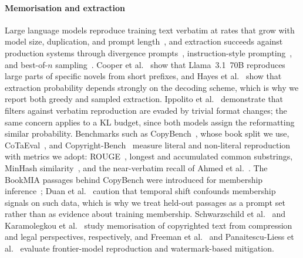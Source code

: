 \paragraph{Memorisation and extraction}
Large language models reproduce training text verbatim at rates that grow with model size, duplication, and prompt length~\cite{carlini2023quantifying}, and extraction succeeds against production systems through divergence prompts~\cite{nasr2025scalable}, instruction-style prompting~\cite{kassem2025alpaca}, and best-of-$n$ sampling~\cite{ahmed2026extracting}. Cooper et al.~\cite{cooper2025extracting} show that Llama~3.1~70B reproduces large parts of specific novels from short prefixes, and Hayes et al.~\cite{hayes2025measuring} show that extraction probability depends strongly on the decoding scheme, which is why we report both greedy and sampled extraction. Ippolito et al.~\cite{ippolito2023preventing} demonstrate that filters against verbatim reproduction are evaded by trivial format changes; the same concern applies to a KL budget, since both models assign the reformatting similar probability. Benchmarks such as CopyBench~\cite{chen2024copybench}, whose book split we use, CoTaEval~\cite{wei2024cotaeval}, and Copyright-Bench~\cite{hui2026copyrightbench} measure literal and non-literal reproduction with metrics we adopt: ROUGE~\cite{lin2004rouge}, longest and accumulated common substrings, MinHash similarity~\cite{broder1997resemblance}, and the near-verbatim recall of Ahmed et al.~\cite{ahmed2026extracting}. The BookMIA passages behind CopyBench were introduced for membership inference~\cite{shi2024detecting}; Duan et al.~\cite{duan2024membership} caution that temporal shift confounds membership signals on such data, which is why we treat held-out passages as a prompt set rather than as evidence about training membership. Schwarzschild et al.~\cite{schwarzschild2024rethinking} and Karamolegkou et al.~\cite{karamolegkou2023copyright} study memorisation of copyrighted text from compression and legal perspectives, respectively, and Freeman et al.~\cite{freeman2024exploring} and Panaitescu-Liess et al.~\cite{panaitescu2025watermarking} evaluate frontier-model reproduction and watermark-based mitigation.

